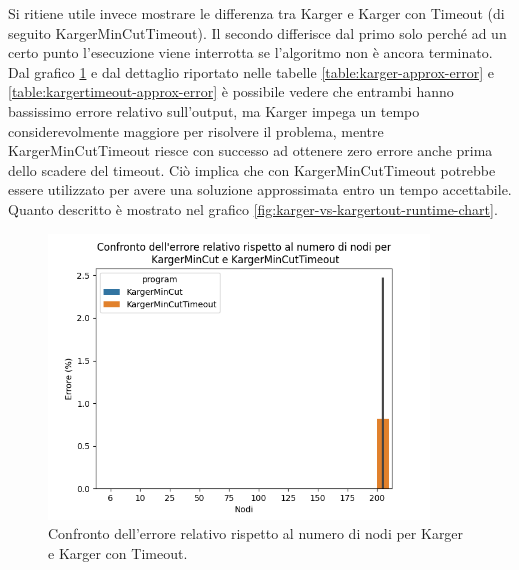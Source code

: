 \noindent Si ritiene utile invece mostrare le differenza tra
Karger e Karger con Timeout (di seguito KargerMinCutTimeout). Il secondo
differisce dal primo solo perché ad un certo punto l'esecuzione viene
interrotta se l'algoritmo non è ancora terminato.\\

\noindent Dal grafico \ref{fig:karger-vs-kargertout-error-chart} e dal
dettaglio riportato nelle tabelle \ref{table:karger-approx-error} e
\ref{table:kargertimeout-approx-error} è possibile vedere che entrambi
hanno bassissimo errore relativo sull'output, ma Karger impega un
tempo considerevolmente maggiore per risolvere il problema, mentre
KargerMinCutTimeout riesce con successo ad ottenere zero errore anche
prima dello scadere del timeout. Ciò implica che con
KargerMinCutTimeout potrebbe essere utilizzato per avere una soluzione
approssimata entro un tempo accettabile. Quanto descritto è mostrato
nel grafico \ref{fig:karger-vs-kargertout-runtime-chart}.

\begin{figure}[H]
    \centering

    \includegraphics[width=0.9\textwidth]{./images/Confronto_dell'errore_relativo_rispetto_al_numero_di_nodi_per__KargerMinCut_e_KargerMinCutTimeout.png}

    \caption{Confronto dell'errore relativo rispetto al numero di nodi per Karger e Karger con Timeout.}
    \label{fig:karger-vs-kargertout-error-chart}
\end{figure}

